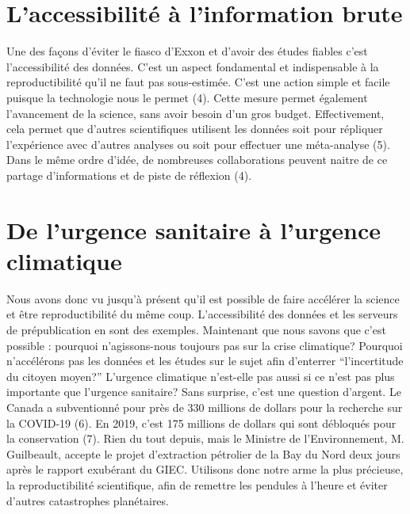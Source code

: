 \documentclass[9pt,twocolumn,twoside,]{pnas-new}
\begin{document}
\hypertarget{laccessibilituxe9-uxe0-linformation-brute}{%
\section{L'accessibilité à l'information
brute}\label{laccessibilituxe9-uxe0-linformation-brute}}

Une des façons d'éviter le fiasco d'Exxon et d'avoir des études fiables
c'est l'accessibilité des données. C'est un aspect fondamental et
indispensable à la reproductibilité qu'il ne faut pas sous-estimée.
C'est une action simple et facile puisque la technologie nous le permet
(4). Cette mesure permet également l'avancement de la science, sans
avoir besoin d'un gros budget. Effectivement, cela permet que d'autres
scientifiques utilisent les données soit pour répliquer l'expérience
avec d'autres analyses ou soit pour effectuer une méta-analyse (5). Dans
le même ordre d'idée, de nombreuses collaborations peuvent naitre de ce
partage d'informations et de piste de réflexion (4).

\hypertarget{de-lurgence-sanitaire-uxe0-lurgence-climatique}{%
\section{De l'urgence sanitaire à l'urgence
climatique}\label{de-lurgence-sanitaire-uxe0-lurgence-climatique}}

Nous avons donc vu jusqu'à présent qu'il est possible de faire accélérer
la science et être reproductibilité du même coup. L'accessibilité des
données et les serveurs de prépublication en sont des exemples.
Maintenant que nous savons que c'est possible : pourquoi n'agissons-nous
toujours pas sur la crise climatique? Pourquoi n'accélérons pas les
données et les études sur le sujet afin d'enterrer ``l'incertitude du
citoyen moyen?'' L'urgence climatique n'est-elle pas aussi si ce n'est
pas plus importante que l'urgence sanitaire? Sans surprise, c'est une
question d'argent. Le Canada a subventionné pour près de 330 millions de
dollars pour la recherche sur la COVID-19 (6). En 2019, c'est 175
millions de dollars qui sont débloqués pour la conservation (7). Rien du
tout depuis, mais le Ministre de l'Environnement, M. Guilbeault, accepte
le projet d'extraction pétrolier de la Bay du Nord deux jours après le
rapport exubérant du GIEC. Utilisons donc notre arme la plus précieuse,
la reproductibilité scientifique, afin de remettre les pendules à
l'heure et éviter d'autres catastrophes planétaires.
\end{document}
